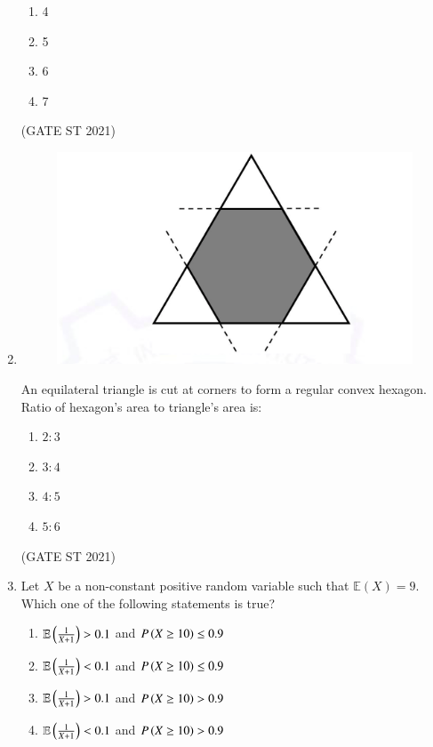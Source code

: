 \documentclass[journal,12pt,onecolumn]{IEEEtran}
\theoremstyle{remark}
\begin{document}
\begin{enumerate}
\begin{enumerate}
\item 4
\item 5
\item 6
\item 7
\end{enumerate}

\hfill (GATE ST 2021) \\

\newpage

\item 
\begin{figure}
    \centering
    \includegraphics[width=0.5\linewidth]{figs/5.png}
    \caption{}
    \label{fig:3}
\end{figure}

An equilateral triangle is cut at corners to form a regular convex hexagon.  
Ratio of hexagon's area to triangle's area is:

\begin{enumerate}
\item $2:3$
\item $3:4$
\item $4:5$
\item $5:6$
\end{enumerate}

\hfill (GATE ST 2021) \\

\item
Let $X$ be a non-constant positive random variable such that $\mathbb{E}(X) = 9$.  
Which one of the following statements is true?

\begin{enumerate}
\item $\mathbb{E} \left(\frac{1}{X+1}\right)  > 0.1$ and $P\left(X \geq 10\right) \leq 0.9$
\item $\mathbb{E} \left(\frac{1}{X+1}\right)  < 0.1$ and $P\left(X \geq 10\right) \leq 0.9$
\item $\mathbb{E} \left(\frac{1}{X+1}\right)  > 0.1$ and $P\left(X \geq 10\right) > 0.9$
\item $\mathbb{E} \left(\frac{1}{X+1}\right)  < 0.1$ and $P\left(X \geq 10\right) > 0.9$
\end{enumerate}


\end{enumerate}
\end{document}
